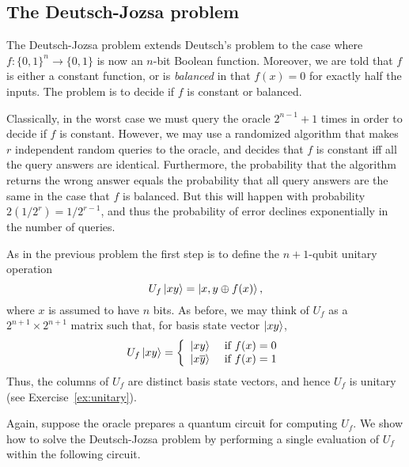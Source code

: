 \documentclass [12pt]{article}
\theoremstyle{definition}
\begin{document}
\newpage
\subsection*{The Deutsch-Jozsa problem}

The Deutsch-Jozsa problem extends Deutsch's problem to the case where $f:\{0,1\}^n\rightarrow \{0,1\}$ is now an $n$-bit Boolean function. Moreover, we are told that $f$ 
is either a constant function, or is \textit{balanced} in that $f(x)=0$ for exactly half the inputs. The problem is to decide if $f$ is constant or balanced.

Classically, in the worst case we must query the oracle $2^{n-1}+1$ times
in order to decide if $f$ is constant. However, we may use a randomized algorithm that makes $r$ independent random queries to the oracle, and decides that $f$ is constant iff
all the query answers are identical. Furthermore, the probability that the algorithm returns the wrong answer equals the probability that all query answers are the same in the case
that $f$ is balanced. But this will happen with probability $2(1/2^r)=1/2^{r-1}$, and thus the probability of error declines exponentially in the number of queries.

As in the previous problem the first step is to define the $n+1$-qubit unitary operation 
\[U_f\ket{xy} = \ket{x,y\oplus f(x)},\]
where $x$ is assumed to have $n$ bits. As before, we may think of $U_f$ as a $2^{n+1}\times 2^{n+1}$ matrix such that, for basis state vector $\ket{xy}$,
\[U_f\ket{xy}=\left\{\begin{array}{ll} 
\ket{xy} & \mbox{ if } f(x) = 0 \\
\ket{x\overline{y}} & \mbox{ if } f(x) = 1 
\end{array}\right.
\]
Thus, the columns of $U_f$ are distinct basis state vectors, and hence $U_f$ is unitary (see Exercise~\ref{ex:unitary}).

Again, suppose the oracle prepares a quantum circuit for computing $U_f$. We show how to solve the Deutsch-Jozsa problem by performing a single evaluation of $U_f$ within
the following circuit.
\end{document}
